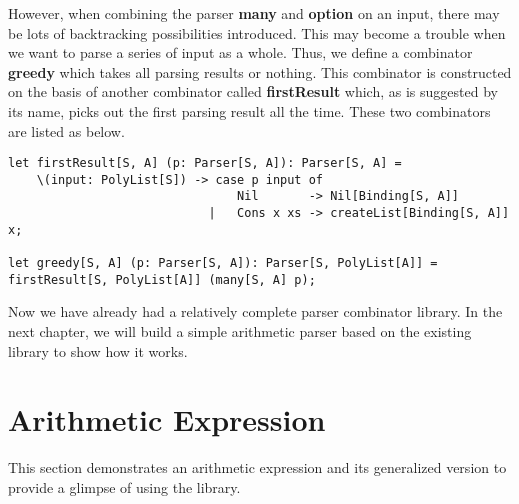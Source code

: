 However, when combining the parser \textbf{many} and \textbf{option} on an input, there may be lots of backtracking possibilities introduced. This may become a trouble when we want to parse a series of input as a whole. Thus, we define a combinator \textbf{greedy} which takes all parsing results or nothing. This combinator is constructed on the basis of another combinator called \textbf{firstResult} which, as is suggested by its name, picks out the first parsing result all the time. These two combinators are listed as below.
\begin{lstlisting}
let firstResult[S, A] (p: Parser[S, A]): Parser[S, A] =
    \(input: PolyList[S]) -> case p input of
                                Nil       -> Nil[Binding[S, A]]
                            |   Cons x xs -> createList[Binding[S, A]] x;
                            
let greedy[S, A] (p: Parser[S, A]): Parser[S, PolyList[A]] = firstResult[S, PolyList[A]] (many[S, A] p);
\end{lstlisting}
Now we have already had a relatively complete parser combinator library. In the next chapter, we will build a simple arithmetic parser based on the existing library to show how it works.

\section{Arithmetic Expression}
This section demonstrates an arithmetic expression and its generalized version to provide a glimpse of using the library.

